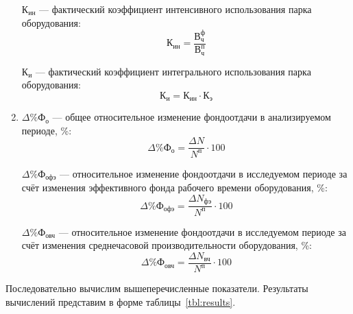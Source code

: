 \begin{enumerate}
    $ \text{К}_{\text{ин}} $ --- фактический коэффициент интенсивного использования парка оборудования:
    \begin{equation*}
      \text{К}_{\text{ин}} = \dfrac{\text{В}^{\text{ф}}_{\text{ч}}}{\text{В}^{\text{п}}_{\text{ч}}}
    \end{equation*}

    $ \text{К}_{\text{и}} $ --- фактический коэффициент интегрального использования парка оборудования:
    \begin{equation*}
      \text{К}_{\text{и}} = \text{К}_{\text{ин}} \cdot \text{К}_{\text{э}}
    \end{equation*}

  \item $ \Delta \% \text{Ф}_{\text{о}} $ --- общее относительное изменение фондоотдачи
    в анализируемом периоде, \%:
    \begin{equation*}
      \Delta \% \text{Ф}_{\text{о}} = \dfrac{\Delta N}{N^{\text{п}}} \cdot 100
    \end{equation*}

    $ \Delta \% \text{Ф}_{\text{офэ}} $ --- относительное изменение фондоотдачи в исследуемом периоде
    за счёт изменения эффективного фонда рабочего времени оборудования, \%:
    \begin{equation*}
      \Delta \% \text{Ф}_{\text{офэ}} = \dfrac{\Delta N_{\text{фэ}}}{N^{\text{п}}} \cdot 100
    \end{equation*}

    $ \Delta \% \text{Ф}_{\text{овч}} $ --- относительное изменение фондоотдачи в исследуемом периоде
    за счёт изменения среднечасовой производительности оборудования, \%:
    \begin{equation*}
      \Delta \% \text{Ф}_{\text{овч}} = \dfrac{\Delta N_{\text{вч}}}{N^{\text{п}}} \cdot 100
    \end{equation*}

\end{enumerate}

Последовательно вычислим вышеперечисленные показатели.
Результаты вычислений представим в форме таблицы~\ref{tbl:results}.

